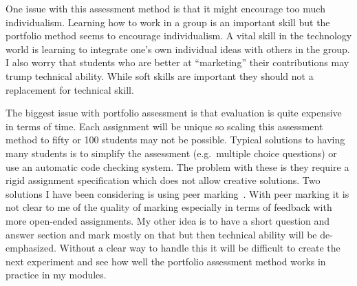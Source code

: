 \documentclass[
]{article}
\begin{document}
One issue with this assessment method is that it might encourage too
much individualism. Learning how to work in a group is an important
skill but the portfolio method seems to encourage individualism. A vital
skill in the technology world is learning to integrate one's own
individual ideas with others in the group. I also worry that students
who are better at ``marketing'' their contributions may trump technical
ability. While soft skills are important they should not a replacement
for technical skill.

The biggest issue with portfolio assessment is that evaluation is quite
expensive in terms of time. Each assignment will be unique so scaling this
assessment method to fifty or 100 students may not be possible.  Typical
solutions to having many students is to simplify the assessment (e.g.~multiple
choice questions) or use an automatic code checking system. The problem with
these is they require a rigid assignment specification which does not allow
creative solutions. Two solutions I have been considering is using peer
marking~\cite{gielen:2010,fry:1990}. With peer marking it is not clear to me of
the quality of marking especially in terms of feedback with more open-ended
assignments. My other idea is to have a short question and answer section and
mark mostly on that but then technical ability will be de-emphasized. Without a
clear way to handle this it will be difficult to create the next experiment and
see how well the portfolio assessment method works in practice in my modules.



\end{document}
